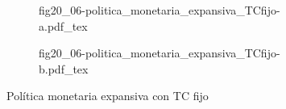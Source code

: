 \begin{figure}[h]
\captionsetup[subfigure]{aboveskip=20pt,belowskip=15pt}
\centering
\begin{subfigure}{.45\textwidth}
  \centering
        \def\svgwidth{\textwidth}
        {fig20_06-politica_monetaria_expansiva_TCfijo-a.pdf_tex}
\end{subfigure}\hspace{.05\textwidth}
\begin{subfigure}{.45\textwidth}
  \centering
        \def\svgwidth{\textwidth}
        {fig20_06-politica_monetaria_expansiva_TCfijo-b.pdf_tex}
\end{subfigure}
\caption{Política monetaria expansiva con TC fijo}
\label{fig20_06-politica_monetaria_expansiva_TCfijo}
\end{figure}